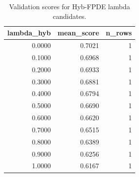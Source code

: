 \begin{table}[t]
\caption{Validation scores for Hyb-FPDE lambda candidates.}
\label{tab:lambda_distribution_computed}
\centering
\begin{tabular}{rrr}
\toprule
lambda\_hyb & mean\_score & n\_rows \\
\midrule
0.0000 & 0.7021 & 1 \\
0.1000 & 0.6968 & 1 \\
0.2000 & 0.6933 & 1 \\
0.3000 & 0.6881 & 1 \\
0.4000 & 0.6794 & 1 \\
0.5000 & 0.6690 & 1 \\
0.6000 & 0.6620 & 1 \\
0.7000 & 0.6515 & 1 \\
0.8000 & 0.6389 & 1 \\
0.9000 & 0.6256 & 1 \\
1.0000 & 0.6167 & 1 \\
\bottomrule
\end{tabular}

\end{table}

